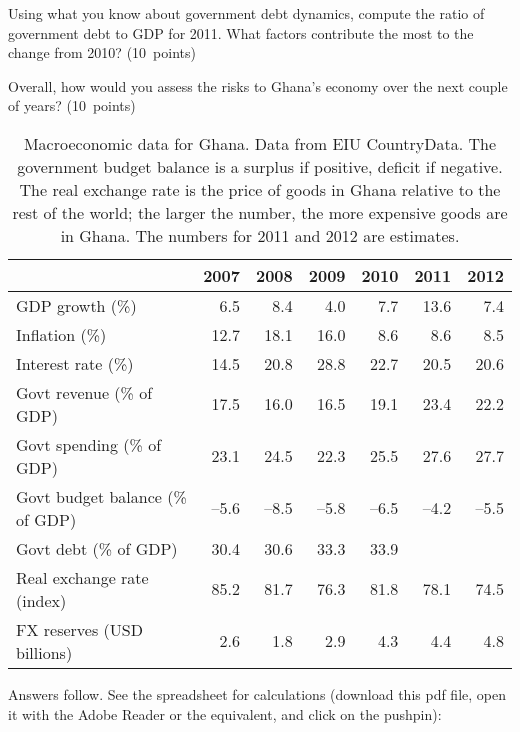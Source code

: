 \documentclass[letterpaper,12pt]{exam}
\begin{document}
\begin{questions}
\begin{parts}
\item Using what you know about government debt dynamics,
compute the ratio of government debt to GDP for 2011.
What factors contribute the most to the change from 2010?
(10~points)

\item Overall, how would you assess the risks to Ghana's economy over
the next couple of years?
(10~points)
\end{parts}

\begin{table}
\centering
\begin{tabular}{lrrrrrr}
\toprule
        & 2007 & 2008 & 2009 & 2010 & 2011 & 2012 \\
\midrule
GDP growth (\%) & 6.5 & 8.4 & 4.0 & 7.7 & 13.6 & 7.4 \\
Inflation (\%)  & 12.7& 18.1 & 16.0 & 8.6 & 8.6 & 8.5 \\
Interest rate (\%) & 14.5 & 20.8 & 28.8 & 22.7 & 20.5 & 20.6  \\
Govt revenue (\% of GDP)  & 17.5 & 16.0 & 16.5 & 19.1 & 23.4 & 22.2 \\
Govt spending (\% of GDP) & 23.1 & 24.5 & 22.3 & 25.5 & 27.6 & 27.7 \\
Govt budget balance (\% of GDP) & --5.6 & --8.5 & --5.8 & --6.5& --4.2 & --5.5\\
Govt debt (\% of GDP) & 30.4 & 30.6 & 33.3 & 33.9 & {\bf } & {\bf } \\ %
Real exchange rate (index) & 85.2 & 81.7 & 76.3 & 81.8 & 78.1 & 74.5\\
FX reserves (USD billions) & 2.6 & 1.8 & 2.9 & 4.3 & 4.4 & 4.8 \\
\bottomrule
\end{tabular}
\caption{Macroeconomic data for Ghana.
Data from EIU CountryData.
The government budget balance is a surplus if positive, deficit if negative.
The real exchange rate is the price of goods in Ghana relative to the rest
of the world;
the larger the number, the more expensive goods are in Ghana.
The numbers for 2011 and 2012 are estimates.
}
\label{tab:ghana}
\end{table}


\begin{solution}
Answers follow.
See the spreadsheet for calculations
(download this pdf file, open it with the Adobe Reader or the equivalent,
and click on the pushpin):


\end{solution}
\end{questions}
\end{document}
